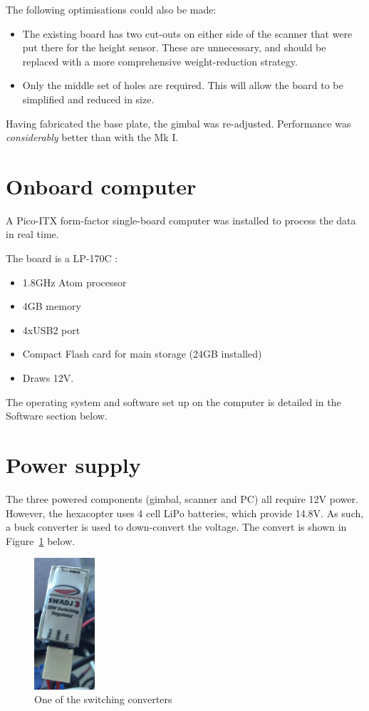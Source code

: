 \documentclass[12pt,oneside,a4paper]{book}
\begin{document}
The following optimisations could also be made:
\begin{itemize}
\item The existing board has two cut-outs on either side of the
  scanner that were put there for the height sensor. These are
  unnecessary, and should be replaced with a more comprehensive
  weight-reduction strategy.
\item Only the middle set of holes are required. This will allow the
  board to be simplified and reduced in size.
\end{itemize}

Having fabricated the base plate, the gimbal was
re-adjusted. Performance was \emph{considerably} better than with the
Mk I.

\section{Onboard computer}
\label{sec:onboard-computer}

A Pico-ITX form-factor single-board computer was installed to process
the data in real time. 

The board is a LP-170C \cite{pc}:
\begin{itemize}
\item 1.8GHz Atom processor
\item 4GB memory
\item 4xUSB2 port
\item Compact Flash card for main storage (24GB installed)
\item Draws 12V.
\end{itemize}

The operating system and software set up on the computer is detailed
in the Software section below.

\section{Power supply}
\label{sec:power-supply-cons}

The three powered components (gimbal, scanner and PC) all require 12V
power. However, the hexacopter uses 4 cell LiPo batteries, which
provide 14.8V. As such, a buck converter is used to down-convert the
voltage. The convert is shown in
Figure~\ref{fig:converter} below.

\begin{figure}[h!]
  \centering
  \includegraphics[width=0.2\textwidth]{figs/converter}
  \caption{One of the switching converters}
  \label{fig:converter}
\end{figure}
\end{document}
